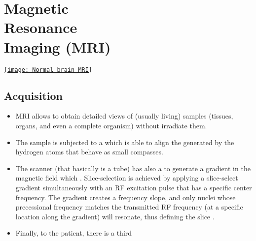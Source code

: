 \chapter{Magnetic\\Resonance\\Imaging (MRI)}
\vspace{-50ex}
\begin{flushright}
\href{https://www.sciencephoto.com/media/728494/view/normal-brain-mri}{\texttt{[image: Normal\_brain\_MRI]}}
\end{flushright}

\section{Acquisition}
\begin{itemize}
\item \gls{MRI}
  \cite{westbrook2018mri,Wu2022MRI_Physics,thePIRL2018NMR_basics,thePIRL2018SpinEcho,thePIRL2018Fourier,thePIRL2018GRE}
  allows to obtain detailed views of (usually living) samples
  (tissues, organs, and even a complete organism) without irradiate
  them.
\item The sample is subjected to a   which
  is able to align the  generated by the hydrogen atoms that
  behave as small compasses.
\item The scanner (that basically is a tube) has also a  to generate a gradient in
  the magnetic field which . Slice-selection is achieved by
  applying a slice-select gradient simultaneously with an RF
  excitation pulse that has a specific center frequency. The gradient
  creates a frequency slope, and only nuclei whose precessional
  frequency matches the transmitted RF frequency (at a specific
  location along the gradient) will resonate, thus defining the slice
  \cite{westbrook2018mri}.
\item Finally,  to the patient, there is a third

\end{itemize}
